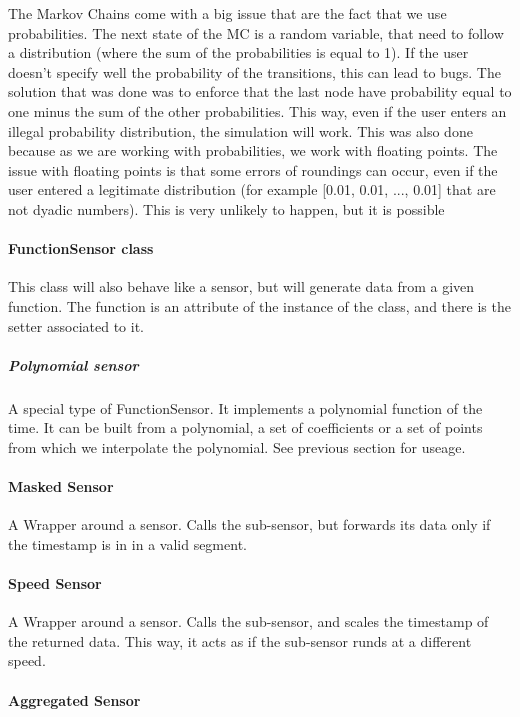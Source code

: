 The Markov Chains come with a big issue that are the fact that we use
probabilities. The next state of the MC is a random variable, that need to
follow a distribution (where the sum of the probabilities is equal to 1). If
the user doesn't specify well the probability of the transitions, this can lead
to bugs. The solution that was done was to enforce that the last node have
probability equal to one minus the sum of the other probabilities. This way,
even if the user enters an illegal probability distribution, the simulation
will work.
This was also done because as we are working with probabilities, we work
with floating points. The issue with floating points is that some errors of
roundings can occur, even if the user entered a legitimate distribution (for
example [0.01, 0.01, ..., 0.01] that are not dyadic numbers). This is very
unlikely to happen, but it is possible

\paragraph{FunctionSensor class}

This class will also behave like a sensor, but will generate data from a given
function. The function is an attribute of the instance of the class, and there
is the setter associated to it.

\subparagraph{Polynomial sensor}

A special type of FunctionSensor. It implements a polynomial function of
the time. It can be built from a polynomial, a set of coefficients or a set
of points from which we interpolate the polynomial. See previous section for
useage.

\paragraph{Masked Sensor}

A Wrapper around a sensor. Calls the sub-sensor, but forwards its data only if
the timestamp is in in a valid segment.

\paragraph{Speed Sensor}

A Wrapper around a sensor. Calls the sub-sensor, and scales the timestamp of
the returned data. This way, it acts as if the sub-sensor runds at a different
speed.

\paragraph{Aggregated Sensor}

